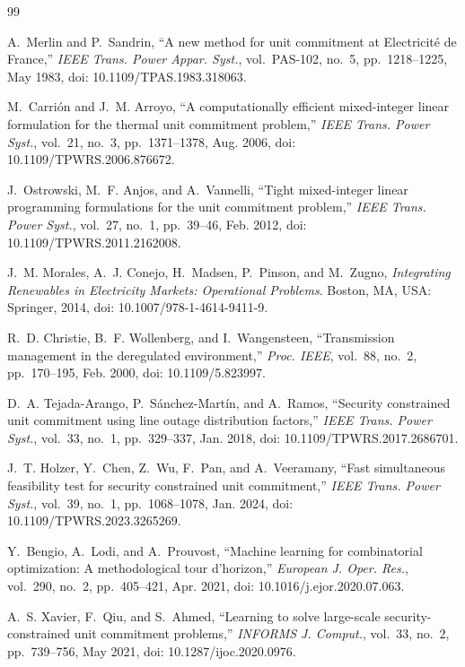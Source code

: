 \documentclass[runningheads]{llncs}
\begin{document}
\begin{thebibliography}{99}

A.~Merlin and P.~Sandrin, ``A new method for unit commitment at Electricit\'e de France,'' \emph{IEEE Trans. Power Appar. Syst.}, vol.~PAS-102, no.~5, pp.~1218--1225, May 1983, doi: 10.1109/TPAS.1983.318063.

M.~Carri\'on and J.~M. Arroyo, ``A computationally efficient mixed-integer linear formulation for the thermal unit commitment problem,'' \emph{IEEE Trans. Power Syst.}, vol.~21, no.~3, pp.~1371--1378, Aug. 2006, doi: 10.1109/TPWRS.2006.876672.

J.~Ostrowski, M.~F. Anjos, and A.~Vannelli, ``Tight mixed-integer linear programming formulations for the unit commitment problem,'' \emph{IEEE Trans. Power Syst.}, vol.~27, no.~1, pp.~39--46, Feb. 2012, doi: 10.1109/TPWRS.2011.2162008.

J.~M. Morales, A.~J. Conejo, H.~Madsen, P.~Pinson, and M.~Zugno, \emph{Integrating Renewables in Electricity Markets: Operational Problems}. Boston, MA, USA: Springer, 2014, doi: 10.1007/978-1-4614-9411-9.

R.~D. Christie, B.~F. Wollenberg, and I.~Wangensteen, ``Transmission management in the deregulated environment,'' \emph{Proc. IEEE}, vol.~88, no.~2, pp.~170--195, Feb. 2000, doi: 10.1109/5.823997.

D.~A. Tejada-Arango, P.~S\'anchez-Mart\'in, and A.~Ramos, ``Security constrained unit commitment using line outage distribution factors,'' \emph{IEEE Trans. Power Syst.}, vol.~33, no.~1, pp.~329--337, Jan. 2018, doi: 10.1109/TPWRS.2017.2686701.

J.~T. Holzer, Y.~Chen, Z.~Wu, F.~Pan, and A.~Veeramany, ``Fast simultaneous feasibility test for security constrained unit commitment,'' \emph{IEEE Trans. Power Syst.}, vol.~39, no.~1, pp.~1068--1078, Jan. 2024, doi: 10.1109/TPWRS.2023.3265269.

Y.~Bengio, A.~Lodi, and A.~Prouvost, ``Machine learning for combinatorial optimization: A methodological tour d'horizon,'' \emph{European J. Oper. Res.}, vol.~290, no.~2, pp.~405--421, Apr. 2021, doi: 10.1016/j.ejor.2020.07.063.

A.~S. Xavier, F.~Qiu, and S.~Ahmed, ``Learning to solve large-scale security-constrained unit commitment problems,'' \emph{INFORMS J. Comput.}, vol.~33, no.~2, pp.~739--756, May 2021, doi: 10.1287/ijoc.2020.0976.


\end{thebibliography}
\end{document}
